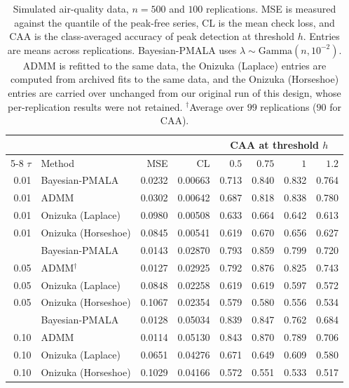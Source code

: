 \begin{table}[tb]
\centering
\small
\setlength{\tabcolsep}{4pt}
\caption{Simulated air-quality data, $n=500$ and $100$ replications. MSE is measured against the quantile of the peak-free series, CL is the mean check loss, and CAA is the class-averaged accuracy of peak detection at threshold $h$. Entries are means across replications. Bayesian-PMALA uses $\lambda\sim\mathrm{Gamma}(n,10^{-2})$. ADMM is refitted to the same data, the Onizuka (Laplace) entries are computed from archived fits to the same data, and the Onizuka (Horseshoe) entries are carried over unchanged from our original run of this design, whose per-replication results were not retained. $^{\dagger}$Average over $99$ replications ($90$ for CAA).}
\label{tab:air_n500}
\begin{tabular}{@{}rlrrrrrr@{}}
\toprule
 & & & & \multicolumn{4}{c}{CAA at threshold $h$} \\
\cmidrule(lr){5-8}
$\tau$ & Method & MSE & CL & $0.5$ & $0.75$ & $1$ & $1.2$ \\
\midrule
0.01 & Bayesian-PMALA & 0.0232 & 0.00663 & 0.713 & 0.840 & 0.832 & 0.764 \\
0.01 & ADMM & 0.0302 & 0.00642 & 0.687 & 0.818 & 0.838 & 0.780 \\
0.01 & Onizuka (Laplace) & 0.0980 & 0.00508 & 0.633 & 0.664 & 0.642 & 0.613 \\
0.01 & Onizuka (Horseshoe) & 0.0845 & 0.00541 & 0.619 & 0.670 & 0.656 & 0.627 \\
\addlinespace[3pt]
0.05 & Bayesian-PMALA & 0.0143 & 0.02870 & 0.793 & 0.859 & 0.799 & 0.720 \\
0.05 & ADMM$^{\dagger}$ & 0.0127 & 0.02925 & 0.792 & 0.876 & 0.825 & 0.743 \\
0.05 & Onizuka (Laplace) & 0.0848 & 0.02258 & 0.619 & 0.619 & 0.597 & 0.572 \\
0.05 & Onizuka (Horseshoe) & 0.1067 & 0.02354 & 0.579 & 0.580 & 0.556 & 0.534 \\
\addlinespace[3pt]
0.10 & Bayesian-PMALA & 0.0128 & 0.05034 & 0.839 & 0.847 & 0.762 & 0.684 \\
0.10 & ADMM & 0.0114 & 0.05130 & 0.843 & 0.870 & 0.789 & 0.706 \\
0.10 & Onizuka (Laplace) & 0.0651 & 0.04276 & 0.671 & 0.649 & 0.609 & 0.580 \\
0.10 & Onizuka (Horseshoe) & 0.1029 & 0.04166 & 0.572 & 0.551 & 0.533 & 0.517 \\
\bottomrule
\end{tabular}
\end{table}

